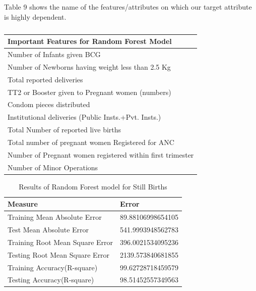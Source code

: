 \documentclass[12pt]{article}
\begin{document}
Table 9 shows the name of the features/attributes on which our target attribute is highly dependent.\\
\begin{table}[!h]
\centering
\caption{}
\vspace{5pt}
\begin{tabular}{|l|}
\hline
\textbf{Important Features for Random Forest Model}          \\ \hline
Number of Infants given BCG                                      \\
Number of Newborns having weight less than 2.5 Kg                 \\
Total reported deliveries                                        \\
TT2 or Booster given to Pregnant women (numbers)                 \\                         
Condom pieces distributed                                        \\
Institutional deliveries (Public Insts.+Pvt. Insts.)          \\
Total Number of reported live births                              \\
Total number of pregnant women Registered for ANC                   \\
Number of Pregnant women registered within first trimester                                                          \\
Number of Minor Operations             \\ 
\hline
\end{tabular}
\end{table}
\begin{table}[h]
\centering
\caption{Results of Random Forest model for Still Births}
\vspace{5pt}
\begin{tabular}{|l|l|}
\hline
\textbf{Measure}                & \textbf{Error}   \\ \hline
Training Mean Absolute Error    & 89.88106998654105 \\
Test Mean Absolute Error        & 541.9993948562783 \\
Training Root Mean Square Error & 396.0021534095236 \\
Testing Root Mean Square Error  & 2139.573840681855 \\
Training Accuracy(R-square)     & 99.62728718459579 \\
Testing Accuracy(R-square)      & 98.51452557349563 \\ \hline
\end{tabular}
\end{table}
\end{document}
